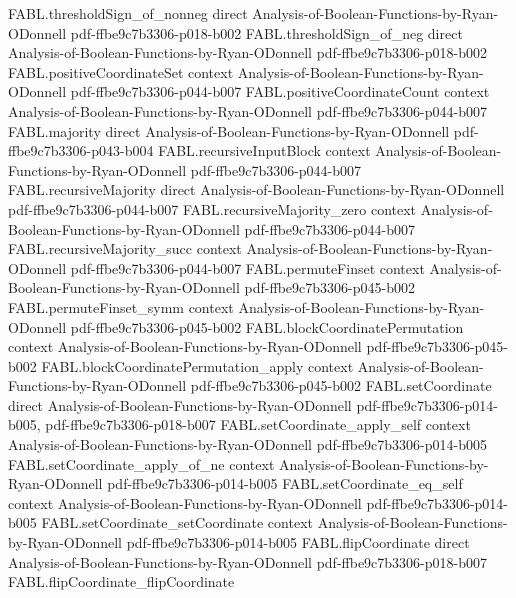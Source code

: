 \begin{theorem}
  {FABL.thresholdSign_of_nonneg}
  {direct}
  {Analysis-of-Boolean-Functions-by-Ryan-ODonnell}
  {pdf-ffbe9c7b3306-p018-b002}
\proofstep
  {FABL.thresholdSign_of_neg}
  {direct}
  {Analysis-of-Boolean-Functions-by-Ryan-ODonnell}
  {pdf-ffbe9c7b3306-p018-b002}
\proofstep
  {FABL.positiveCoordinateSet}
  {context}
  {Analysis-of-Boolean-Functions-by-Ryan-ODonnell}
  {pdf-ffbe9c7b3306-p044-b007}
\proofstep
  {FABL.positiveCoordinateCount}
  {context}
  {Analysis-of-Boolean-Functions-by-Ryan-ODonnell}
  {pdf-ffbe9c7b3306-p044-b007}
\proofstep
  {FABL.majority}
  {direct}
  {Analysis-of-Boolean-Functions-by-Ryan-ODonnell}
  {pdf-ffbe9c7b3306-p043-b004}
\proofstep
  {FABL.recursiveInputBlock}
  {context}
  {Analysis-of-Boolean-Functions-by-Ryan-ODonnell}
  {pdf-ffbe9c7b3306-p044-b007}
\proofstep
  {FABL.recursiveMajority}
  {direct}
  {Analysis-of-Boolean-Functions-by-Ryan-ODonnell}
  {pdf-ffbe9c7b3306-p044-b007}
\proofstep
  {FABL.recursiveMajority_zero}
  {context}
  {Analysis-of-Boolean-Functions-by-Ryan-ODonnell}
  {pdf-ffbe9c7b3306-p044-b007}
\proofstep
  {FABL.recursiveMajority_succ}
  {context}
  {Analysis-of-Boolean-Functions-by-Ryan-ODonnell}
  {pdf-ffbe9c7b3306-p044-b007}
\proofstep
  {FABL.permuteFinset}
  {context}
  {Analysis-of-Boolean-Functions-by-Ryan-ODonnell}
  {pdf-ffbe9c7b3306-p045-b002}
\proofstep
  {FABL.permuteFinset_symm}
  {context}
  {Analysis-of-Boolean-Functions-by-Ryan-ODonnell}
  {pdf-ffbe9c7b3306-p045-b002}
\proofstep
  {FABL.blockCoordinatePermutation}
  {context}
  {Analysis-of-Boolean-Functions-by-Ryan-ODonnell}
  {pdf-ffbe9c7b3306-p045-b002}
\proofstep
  {FABL.blockCoordinatePermutation_apply}
  {context}
  {Analysis-of-Boolean-Functions-by-Ryan-ODonnell}
  {pdf-ffbe9c7b3306-p045-b002}
\proofstep
  {FABL.setCoordinate}
  {direct}
  {Analysis-of-Boolean-Functions-by-Ryan-ODonnell}
  {pdf-ffbe9c7b3306-p014-b005,
    pdf-ffbe9c7b3306-p018-b007}
\proofstep
  {FABL.setCoordinate_apply_self}
  {context}
  {Analysis-of-Boolean-Functions-by-Ryan-ODonnell}
  {pdf-ffbe9c7b3306-p014-b005}
\proofstep
  {FABL.setCoordinate_apply_of_ne}
  {context}
  {Analysis-of-Boolean-Functions-by-Ryan-ODonnell}
  {pdf-ffbe9c7b3306-p014-b005}
\proofstep
  {FABL.setCoordinate_eq_self}
  {context}
  {Analysis-of-Boolean-Functions-by-Ryan-ODonnell}
  {pdf-ffbe9c7b3306-p014-b005}
\proofstep
  {FABL.setCoordinate_setCoordinate}
  {context}
  {Analysis-of-Boolean-Functions-by-Ryan-ODonnell}
  {pdf-ffbe9c7b3306-p014-b005}
\proofstep
  {FABL.flipCoordinate}
  {direct}
  {Analysis-of-Boolean-Functions-by-Ryan-ODonnell}
  {pdf-ffbe9c7b3306-p018-b007}
\proofstep
  {FABL.flipCoordinate_flipCoordinate}

\end{theorem}
